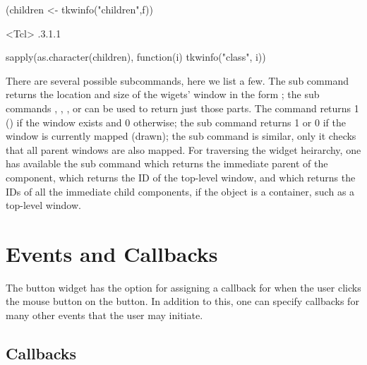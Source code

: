 \begin{Schunk}
\begin{Sinput}
 (children <- tkwinfo("children",f))
\end{Sinput}
\begin{Soutput}
<Tcl> .3.1.1 
\end{Soutput}
\begin{Sinput}
 sapply(as.character(children), function(i) tkwinfo("class", i))
\end{Sinput}
\end{Schunk}

There are several possible subcommands, here we list a few. The
 sub command returns the location and
size of the wigets' window in the form ;
the sub commands ,
, , or
 can be used to return just those parts. The
 command returns 1 () if the
window exists and 0 otherwise; the  sub
command returns 1 or 0 if the window is currently mapped (drawn); the
 sub command is similar, only it checks
that all parent windows are also mapped.  For traversing the widget
heirarchy, one has available the  sub
command which returns the immediate parent of the component,
 which returns the ID of the top-level
window, and  which returns the IDs of
all the immediate child components, if the object is a container, such
as a top-level window.



\section{Events and Callbacks}
\label{sec:tcltk:overview:events-callbacks}

The button widget has the  option for assigning a callback for when the user clicks the mouse button on the button. In addition to this, one can specify callbacks for many other events that the user may initiate. 


\subsection{Callbacks}
\label{sec:tcltk:callbacks}

